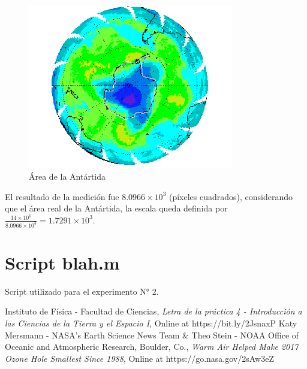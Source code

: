 \documentclass[a4paper]{article}
\begin{document}
\begin{appendices}
\begin{figure}[ht]
\centering
\includegraphics[width=0.8\textwidth]{assets/area_antartida.png}
\caption{\label{fig:area_antartida}Área de la Antártida}
\end{figure}

El resultado de la medición fue $8.0966 \times 10^3$ (píxeles cuadrados), considerando que el área real de la Antártida, la escala queda definida por $\frac{14 \times 10^6}{8.0966 \times 10^3} = 1.7291 \times 10^3$.




\section{Script blah.m}
\label{appendix:B}

Script utilizado para el experimento N° 2.

%
%



\end{appendices}

\begin{thebibliography}{9}
\label{bib:letra}
  Instituto de Física - Facultad de Ciencias,
  \emph{Letra de la práctica 4 - Introducción a las Ciencias de la Tierra y el Espacio I},
  Online at https://bit.ly/2JsnaxP
\label{bib:nasaArticle}
  Katy Mersmann - NASA's Earth Science News Team & Theo Stein - NOAA Office of Oceanic and Atmospheric Research, Boulder, Co.,
  \emph{Warm Air Helped Make 2017 Ozone Hole Smallest Since 1988},
  Online at https://go.nasa.gov/2sAw3eZ
\end{thebibliography}
\end{document}
